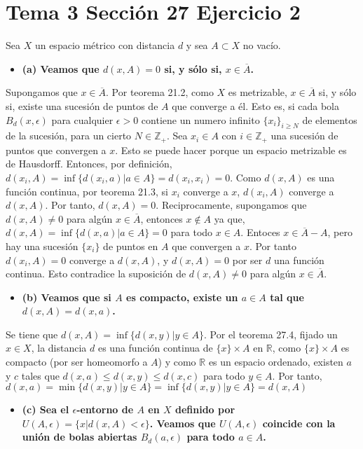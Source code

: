 \documentclass{article}
\begin{document}
\section{Tema 3 Sección 27 Ejercicio 2}
Sea $X$ un espacio métrico con distancia $d$ y sea $A\subset X$ no vacío.
\begin{itemize}
\item \bf (a) \rm Veamos que $d(x,A)=0$ si, y sólo si, $x\in \overline{A}$.
\end{itemize}
Supongamos que $x\in \overline{A}$. Por teorema 21.2, como $X$ es metrizable, $x\in \overline{A}$ si, y sólo si, existe una sucesión de puntos de $A$ que converge a él. Esto es, si cada bola $B_d(x,\epsilon)$ para cualquier $\epsilon>0$ contiene un numero infinito $\{x_i\}_{i\geq N}$ de elementos de la sucesión, para un cierto $N\in \mathbb{Z}_+$. Sea $x_i\in A$ con $i\in \mathbb{Z}_+$ una sucesión de puntos que convergen a $x$. Esto se puede hacer porque un espacio metrizable es de Hausdorff. Entonces, por definición, $d(x_i,A)=\inf\{d(x_i,a)|a\in A\}=d(x_i,x_i)=0$. Como $d(x,A)$ es una función continua, por teorema 21.3, si $x_i$ converge a $x$, $d(x_i,A)$ converge a $d(x,A)$. Por tanto, $d(x,A)=0$.
Reciprocamente, supongamos que $d(x,A)\neq 0$ para algún $x\in \overline{A}$, entonces $x\notin A$ ya que, $d(x,A)=\inf\{d(x,a)|a\in A\}=0$ para todo $x\in A$. Entoces $x\in \overline{A}-A$, pero hay una sucesión $\{x_i\}$ de puntos en $A$ que convergen a $x$. Por tanto $d(x_i,A)=0$ converge a $d(x,A)$, y $d(x,A)=0$ por ser $d$ una función continua. Esto contradice la suposición de $d(x,A)\neq 0$ para algún $x\in \overline{A}$.
\begin{itemize}
\item \bf (b) \rm Veamos que si $A$ es compacto, existe un $a\in A$ tal que $d(x,A)=d(x,a)$.
\end{itemize}
Se tiene que $d(x,A)=\inf\{d(x,y)|y\in A\}$. Por el teorema 27.4, fijado un $x\in X$, la distancia $d$ es una función continua de $\{x\}\times A$ en $\mathbb{R}$, como $\{x\}\times A$ es compacto (por ser homeomorfo a $A$) y como $\mathbb{R}$ es un espacio ordenado, existen $a$ y $c$ tales que $d(x,a)\leq d(x,y)\leq d(x,c)$ para todo $y\in A$. Por tanto, $d(x,a)=\min\{d(x,y)|y\in A\}=\inf\{d(x,y)|y\in A\}=d(x,A)$
\begin{itemize}
\item \bf (c) \rm Sea el $\epsilon$-entorno de $A$ en $X$ definido por $U(A,\epsilon)=\{x|d(x,A)<\epsilon\}$. Veamos que $U(A,\epsilon)$ coincide con la unión de bolas abiertas $B_d(a,\epsilon)$ para todo $a\in A$.
\end{itemize}
\end{document}
